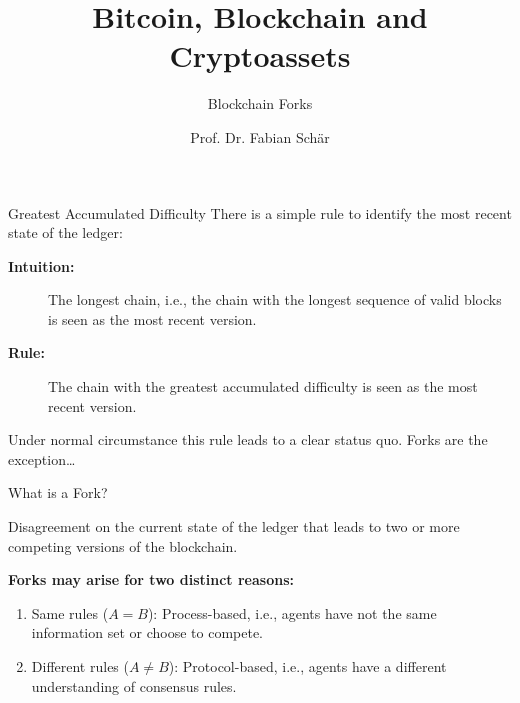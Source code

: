 \documentclass[handout]{beamer}
\title{Bitcoin, Blockchain and Cryptoassets}
\subtitle{Blockchain Forks}
\author{Prof. Dr. Fabian Schär}
\institute{University of Basel}
\begin{document}
\thispagestyle{empty}
\begin{frame}[noframenumbering]
	\titlepage
\end{frame}



\begin{frame}{Greatest Accumulated Difficulty}
	There is a simple rule to identify the most recent state of the ledger:
	\vspace{1em}
	
	\begin{description}
		\item[\textbf{Intuition:}] The longest chain, i.e., the chain with the longest sequence of valid blocks is seen as the most recent version.
		\item[\textbf{Rule:}] The chain with the \color{focus} greatest accumulated difficulty \color{black} is seen as the most recent version. 
	\end{description}
	
	\vspace{1em}
	
	Under normal circumstance this rule leads to a clear status quo. Forks are the exception\dots
\end{frame}


\begin{frame}{What is a Fork?}

\color{focus} Disagreement on the current state \color{black} of the ledger that leads to two or more competing versions of the blockchain.

\begin{figure}[h]
  	\center
  	\resizebox{0.55\textwidth}{!}{
	
	}
\end{figure}

\vspace{1em}
\textbf{Forks may arise for two distinct reasons:}
\begin{enumerate}
	\item Same rules ($A = B$): Process-based, i.e., agents have not the same information set or choose to compete.
	\item Different rules ($A \neq B$): Protocol-based, i.e., agents have a different understanding of consensus rules.
\end{enumerate}

\end{frame}
\end{document}
